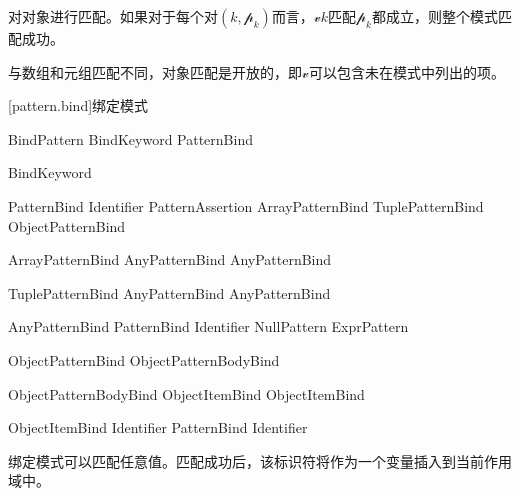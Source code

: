 \pnum
{}对对象进行匹配。如果对于每个对$(k, \mathcal{p}_k)$而言，$\mathcal{v}$$k$匹配$\mathcal{p}_k$都成立，则整个模式匹配成功。

\pnum
与数组和元组匹配不同，对象匹配是开放的，即$\mathcal{v}$可以包含未在模式中列出的项。

[pattern.bind]{绑定模式}

\begin{bnf}{BindPattern}
    BindKeyword PatternBind
\end{bnf}

\begin{bnf}{BindKeyword}
     \br
      \br
\end{bnf}

\begin{bnf}{PatternBind}
    Identifier PatternAssertion \br
    ArrayPatternBind \br
    TuplePatternBind \br
    ObjectPatternBind
\end{bnf}

\begin{bnf}{ArrayPatternBind}
    \terminal{[} AnyPatternBind \bnflp\terminal{,} AnyPatternBind\bnfrp\bnfs \terminal{]}
\end{bnf}

\begin{bnf}{TuplePatternBind}
    \terminal{(} AnyPatternBind \bnflp\terminal{,} AnyPatternBind\bnfrp\bnfs \terminal{)}
\end{bnf}

\begin{bnf}{AnyPatternBind}
    PatternBind \br
     Identifier\bnfq \br
    NullPattern \br
    ExprPattern
\end{bnf}

\begin{bnf}{ObjectPatternBind}
    \terminal{\{} ObjectPatternBodyBind \terminal{\}}
\end{bnf}

\begin{bnf}{ObjectPatternBodyBind}
    ObjectItemBind \bnflp\terminal{,} ObjectItemBind\bnfrp\bnfs
\end{bnf}

\begin{bnf}{ObjectItemBind}
    Identifier \terminal{:} PatternBind \br
    Identifier
\end{bnf}

\pnum
绑定模式可以匹配任意值。匹配成功后，该标识符将作为一个变量插入到当前作用域中。

